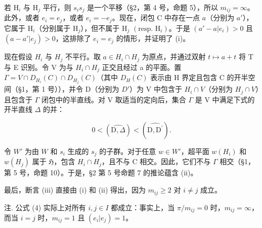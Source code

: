 若 \(\mathrm{H}_i\) 与 \(\mathrm{H}_j\) 平行，则 \(s_i s_j\) 是一个平移（§2，第 4 号，命题 5），所以 \(m_{ij} = \infty\)。此外，或者 \(e_i = e_j\)，或者 \(e_i = -e_j\)。现在，闭包 C 中存在一点 \(a\)（分别为 \(a'\)），它属于 \(\mathrm{H}_i\)（分别属于 \(\mathrm{H}_j\)），但不属于 \(\mathrm{H}_j\) \((\text{resp. } \mathrm{H}_i)\)。于是 \((a' - a|e_i) > 0\) 且 \((a - a'|e_j) > 0\)，这排除了 \(e_i = e_j\) 的情形，并证明了 (i)。

现在假设 \(H_{i}\) 与 \(H_{j}\) 不平行。取 \(a \in H_{i} \cap H_{j}\) 为原点，并通过双射 \(t \mapsto a + t\) 将 T 与 E 识别。令 V 为与 \(H_{i} \cap H_{j}\) 正交且经过 a 的平面。置 \(\Gamma = V \cap D_{H_{i}}(C) \cap D_{H_{j}}(C)\)（其中 \(D_{H}(C)\) 表示由 H 界定且包含 C 的开半空间（§1，第 1 号）），并令 D（分别为 \(D'\)）为 V 中包含于 \(H_{i} \cap V\)（分别为 \(H_{j} \cap V\)）且包含于 \(\Gamma\) 闭包中的半直线。对 V 取适当的定向后，集合 \(\Gamma\) 是 V 中满足下式的开半直线 \(\Delta\) 的并：

\[
0 <   (\widehat {\mathrm{D} , \Delta}) <   (\widehat {\mathrm{D} , \mathrm{D} ^ {\prime}}).
\]

令 \(W'\) 为由 \(W\) 和 \(s_i\) 生成的 \(s_j\) 的子群。对于任意 \(w \in W'\)，超平面 \(w(H_i)\) 和 \(w(H_j)\) 属于 \(\mathfrak{H}\)，包含 \(H_i \cap H_j\)，且不与 C 相交。因此，它们不与 \(\Gamma\) 相交（§1，第 5 号，命题 10）。于是，§2 第 5 号命题 7 的推论蕴含 (ii)。

最后，断言 (iii) 直接由 (i) 和 (ii) 得出，因为 \(m_{ij} \geqslant 2\) 对 \(i \neq j\) 成立。

注. 公式 (4) 实际上对所有 \(i, j \in I\) 都成立：事实上，当 \(\pi / m_{ij} = 0\) 时，\(m_{ij} = \infty\)，而当 \(i = j\) 时，\(m_{ij} = 1\) 且 \((e_i | e_j) = 1\)。

